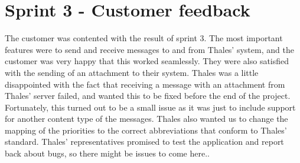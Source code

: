 \section{Sprint 3 - Customer feedback}

The customer was contented with the result of sprint 3. The most important features were to send and receive messages to and from Thales' system, and the customer was very happy that this worked seamlessly. They were also satisfied with the sending of an attachment to their system.
\newline
\newline
Thales was a little disappointed with the fact that receiving a message with an attachment from Thales' server failed, and wanted this to be fixed before the end of the project. Fortunately, this turned out to be a small issue as it was just to include support for another content type of the messages. Thales also wanted us to change the mapping of the priorities to the correct abbreviations that conform to Thales' standard. 
\newline
\newline
Thales' representatives promised to test the application and report back about bugs, so there might be issues to come here..
